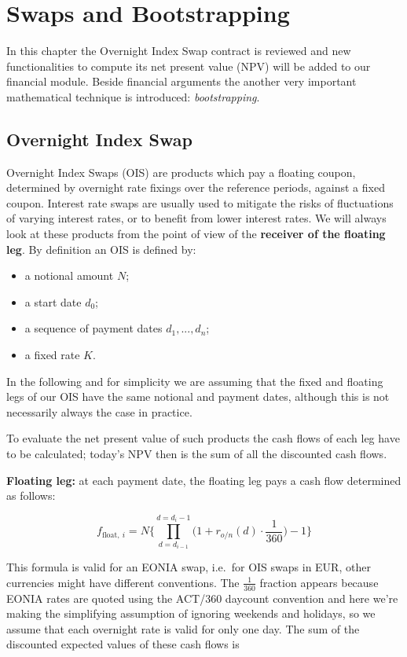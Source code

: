 \chapter{Swaps and Bootstrapping}\label{swaps-and-bootstrapping---practical-lesson-5}

In this chapter the Overnight Index Swap contract is reviewed and new functionalities to compute its net present value (NPV) will be added to our financial module. Beside financial arguments the another very important mathematical technique is introduced: \emph{bootstrapping}.

\section{Overnight Index Swap}\label{overnight-index-swap}

Overnight Index Swaps (OIS) are products which pay a floating coupon, determined by overnight rate fixings over the reference periods, against a fixed coupon. Interest rate swaps are usually used to mitigate the risks of fluctuations of varying interest rates, or to benefit from  lower interest rates. We will always look at these products from the point of view of the \textbf{receiver of the floating leg}. By definition an OIS is defined by:

\begin{itemize}
\tightlist
\item a notional amount \(N\);
\item a start date \(d_0\);
\item a sequence of payment dates \(d_1,...,d_n\);
\item a fixed rate \(K\).
\end{itemize}

In the following and for simplicity we are assuming that the fixed and floating legs of our OIS have the same notional and payment dates, although this is not necessarily always the case in practice.

To evaluate the net present value of such products the cash flows of each leg have to be calculated; today's NPV then is the sum of all the discounted cash flows.

\textbf{Floating leg:} at each payment date, the floating leg pays a cash flow determined as follows:

\[f_{\mathrm{float},~i} = N \Bigg\{\prod_{d=d_{i-1}}^{d=d_i-1}\Big(1+r_{o/n}(d)\cdot\frac{1}{360}\Big) -1 \Bigg\}\]

This formula is valid for an EONIA swap, i.e.~for OIS swaps in EUR, other currencies might have different conventions. The \(\frac{1}{360}\) fraction appears because EONIA rates are quoted using the ACT/360 daycount convention and here we're making the simplifying assumption of ignoring weekends and holidays, so we assume that each overnight rate is valid for only one day.
The sum of the discounted expected values of these cash flows is

